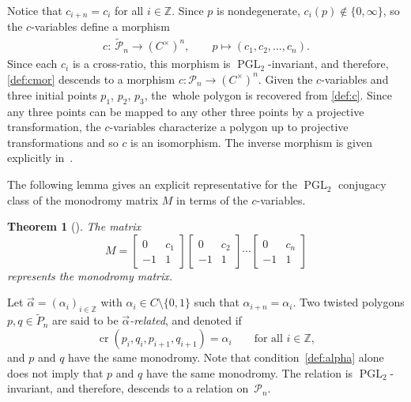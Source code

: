\documentclass[10pt,a4paper]{amsart}
\numberwithin{equation}{section}
\newtheorem{Theorem}{Theorem}[section]
\newcommand{\Z}{{\mathbb Z}}
\newcommand{\C}{{\mathbb C}}
\newcommand{\PGL}{\operatorname{PGL}}
\newcommand{\arv}{\stackrel{\vec \alpha}{\sim}}
\newcommand{\ra}{\rightarrow}
\newcommand{\be}{\begin{equation}}
\newcommand{\ee}{\end{equation}}
\newcommand{\la}{\label}
\def\cro{\operatorname{cr}}
\def\C{C}
\begin{document}
	Notice that $c_{i+n}=c_i$ for all $i \in \Z$. Since $p$ is nondegenerate, $c_i(p) \notin \{0,\infty \}$, so the $c$-variables define a morphism
	\begin{align}\la{def:cmor}
		c\colon\ \widetilde{\mathcal P}_n \ra (\C^\times)^n, \qquad
		p \mapsto (c_1,c_2,\dots,c_n).
	\end{align}
	Since each $c_i$ is a cross-ratio, this morphism is $\PGL_2$-invariant, and therefore, \eqref{def:cmor} descends to a morphism $c\colon \mathcal P_n \ra (\C^\times)^n$. Given the $c$-variables and three initial points $p_1$, $p_2$, $p_3$, the~whole polygon is recovered from \eqref{def:c}. Since any three points can be mapped to any other three points by a projective transformation, the $c$-variables characterize a polygon up to projective transformations and so $c$ is an isomorphism. The inverse morphism is given explicitly in~\mbox{\cite[Section~3.2]{AFIT}}.
	
	The following lemma gives an explicit representative for the $\PGL_2$ conjugacy class of the monodromy matrix $M$ in terms of the $c$-variables.
	\begin{Theorem}[] %
		The matrix
		\[
		M=\begin{bmatrix}
			0 & c_1 \\
			-1 & 1
		\end{bmatrix} \begin{bmatrix}
			0 & c_2 \\
			-1 & 1
		\end{bmatrix} \cdots \begin{bmatrix}
			0 & c_n \\
			-1 & 1
		\end{bmatrix}
		\]
		represents the monodromy matrix.
	\end{Theorem}
	
Let $\vec \alpha = (\alpha_i)_{i \in \Z}$ with $\alpha_i \in \C \setminus \{0,1\}$ such that $\alpha_{i+n}=\alpha_i$.
	Two twisted polygons $p, q \in \widetilde P_n$ are said to be \emph{$\vec \alpha$-related}, and denoted \smash{$p \,\raisebox{-0.5pt}{$\arv$}\, q$} if
 \be \la{def:alpha}
	\cro(p_i,q_i,p_{i+1},q_{i+1}) = \alpha_i \qquad \text{for all $i \in \Z$},
	\ee
	and $p$ and $q$ have the same monodromy. Note that condition~\eqref{def:alpha} alone does not imply that $p$ and $q$ have the same monodromy. The relation \smash{\raisebox{-0.4pt}{$\arv$}} is $\PGL_2$-invariant, and therefore, descends to a relation on~$\mathcal P_n$.
	
\end{document}
